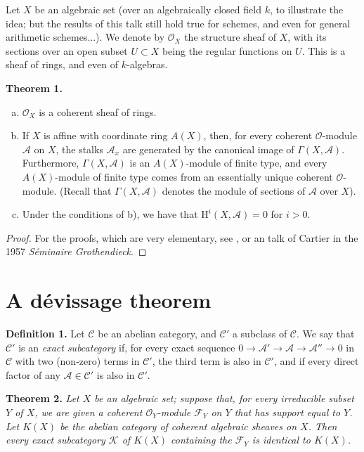 \documentclass{article}
\newenvironment{itenv}[1]
  {\smallskip\noindent\textbf{#1.}\itshape}
  {\smallskip}
\newenvironment{rmenv}[1]
  {\smallskip\noindent\textbf{#1.}\rmfamily}
  {\smallskip}
\newcommand{\scr}[1]{{\mathscr{#1}}}
\renewcommand{\cal}[1]{{\mathcal{#1}}}
\newcommand{\HH}{\mathrm{H}}
\newcommand{\oldpage}[1]{\marginpar{\footnotesize$\Big\vert$ \textit{p.~#1}}}
\begin{document}
Let $X$ be an algebraic set (over an algebraically closed field $k$, to illustrate the idea; but the results of this talk still hold true for schemes, and even for general arithmetic schemes...).
We denote by $\scr{O}_X$ the structure sheaf of $X$, with its sections over an open subset $U\subset X$ being the regular functions on $U$.
This is a sheaf of rings, and even of $k$-algebras.

\begin{itenv}{Theorem 1}
\label{theorem1}
\begin{enumerate}[(a)]
  \item $\scr{O}_X$ is a coherent sheaf of rings.
  \item If $X$ is affine with coordinate ring $A(X)$, then, for every coherent $\scr{O}$-module $\scr{A}$ on $X$, the stalks $\scr{A}_x$ are generated by the canonical image of $\Gamma(X,\scr{A})$.
    Furthermore, $\Gamma(X,\scr{A})$ is an $A(X)$-module of finite type, and every $A(X)$-module of finite type comes from an essentially unique coherent $\scr{O}$-module.
    (Recall that $\Gamma(X,\scr{A})$ denotes the module of sections of $\scr{A}$ over $X$).
  \item Under the conditions of b), we have that $\HH^i(X,\scr{A})=0$ for $i>0$.
\oldpage{2-02}
\end{enumerate}
\end{itenv}

\begin{proof}
  For the proofs, which are very elementary, see \cite[chapitre~2, paragraphes~2,3,4]{1}, or an talk of Cartier in the 1957 \emph{S\'{e}minaire Grothendieck}.
\end{proof}


\section{A d\'{e}vissage theorem}
\label{section2}

\begin{rmenv}{Definition 1}
\label{definition1}
  Let $\cal{C}$ be an abelian category, and $\cal{C}'$ a subclass of $\cal{C}$.
  We say that $\cal{C}'$ is an \emph{exact subcategory} if, for every exact sequence $0\to\scr{A}'\to\scr{A}\to\scr{A}''\to0$ in $\cal{C}$ with two (non-zero) terms in $\cal{C}'$, the third term is also in $\cal{C}'$, and if every direct factor of any $\scr{A}\in\cal{C}'$ is also in $\cal{C}'$.
\end{rmenv}

\begin{itenv}{Theorem 2}
\label{theorem2}
  Let $X$ be an algebraic set;
  suppose that, for every irreducible subset $Y$ of $X$, we are given a coherent $\scr{O}_Y$-module $\scr{F}_Y$ on $Y$ that has support equal to $Y$.
  Let $K(X)$ be the abelian category of coherent algebraic sheaves on $X$.
  Then every \emph{exact} subcategory $\cal{K}$ of $K(X)$ containing the $\scr{F}_Y$ is identical to $K(X)$.
\end{itenv}
\end{document}
